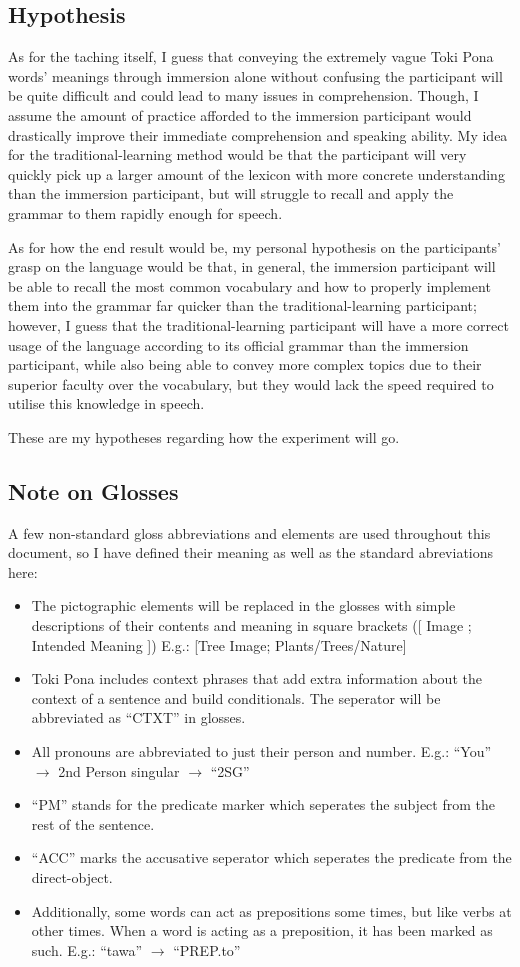 \documentclass[a4paper,10pt]{article}
\begin{document}
\subsection{Hypothesis}
As for the taching itself, I guess that conveying the extremely vague Toki Pona words' meanings
through immersion alone without confusing the participant will be quite difficult and could lead to
many issues in comprehension. Though, I assume the amount of practice afforded to the immersion
participant would drastically improve their immediate comprehension and speaking ability. My idea
for the traditional-learning method would be that the participant will very quickly pick up a
larger amount of the lexicon with more concrete understanding than the immersion participant, but
will struggle to recall and apply the grammar to them rapidly enough for speech.

As for how the end result would be, my personal hypothesis on the participants' grasp on the language
would be that, in general, the immersion participant will be able to recall the most common vocabulary
and how to properly implement them into the grammar far quicker than the traditional-learning
participant; however, I guess that the traditional-learning participant will have a more correct
usage of the language according to its official grammar than the immersion participant, while also
being able to convey more complex topics due to their superior faculty over the vocabulary, but they
would lack the speed required to utilise this knowledge in speech.

These are my hypotheses regarding how the experiment will go.

\subsection{Note on Glosses}
A few non-standard gloss abbreviations and elements are used
throughout this document, so I have defined their meaning as well as the
standard abreviations here:
\begin{itemize}
 \item The pictographic
 elements will be replaced in the glosses with simple descriptions of their
 contents and meaning in square brackets ([ Image ; Intended Meaning ])
 E.g.: [Tree Image; Plants/Trees/Nature]
 \item Toki Pona includes context phrases that add extra information
 about the context of a sentence and build conditionals. The seperator
 will be abbreviated as ``CTXT'' in glosses.
 \item All pronouns are abbreviated to just their person and number.
 E.g.: ``You'' $\rightarrow$ 2nd Person singular $\rightarrow$ ``2SG''
 \item ``PM'' stands for the predicate marker which seperates the subject
 from the rest of the sentence.
 \item ``ACC'' marks the accusative seperator which seperates the predicate
 from the direct-object.
 \item Additionally, some words can act as prepositions some times, but like
 verbs at other times. When a word is acting as a preposition, it has been
 marked as such. E.g.: ``tawa'' $\rightarrow$ ``PREP.to''
\end{itemize}
\end{document}

